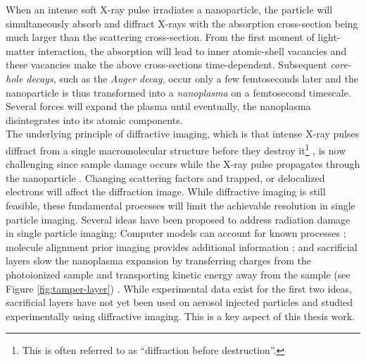 When an intense soft X-ray pulse irradiates a nanoparticle, the particle will simultaneously absorb and diffract X-rays with the absorption cross-section being much larger than the scattering cross-section. From the first moment of light-matter interaction, the absorption will lead to inner atomic-shell vacancies \citep{Young-2010-Nature} and these vacancies make the above cross-sections time-dependent. Subsequent \textit{core-hole decays}, such as the \textit{Auger decay}, occur only a few femtoseconds later and the nanoparticle is thus transformed into a \textit{nanoplasma} on a femtosecond timescale. Several forces will expand the plasma \citep{Gorkhover-2016-NatPho} until eventually, the nanoplasma disintegrates into its atomic components.\\[1\baselineskip]
%
The underlying principle of diffractive imaging, which is that intense X-ray pulses diffract from a single macromolecular structure before they destroy it\footnote{This is often referred to as ``diffraction before destruction''.} \cite{Neutze-2000-Nature}, is now challenging since sample damage occurs while the X-ray pulse propagates through the nanoparticle \cite{Aquila-2015-StrucDyn}. Changing scattering factors and trapped, or delocalized electrons will affect the diffraction image. While diffractive imaging is still feasible, these fundamental processes will limit the achievable resolution in single particle imaging. Several ideas have been proposed to address radiation damage in single particle imaging: Computer models can account for known processes \citep{Quiney-2010-NatPhys}; molecule alignment prior imaging provides additional information \citep{Kupper-2014-PRL}; and sacrificial layers slow the nanoplasma expansion by transferring charges from the photoionized sample and transporting kinetic energy away from the sample (see Figure \ref{fig:tamper-layer}) \citep{Hau-Riege-2004-PRE,Hau-Riege-2010-PRL,Hoener-2008-JPB}. While experimental data exist for the first two ideas, sacrificial layers have not yet been used on aerosol injected particles and studied experimentally using diffractive imaging. This is a key aspect of this thesis work.\\[1\baselineskip]
